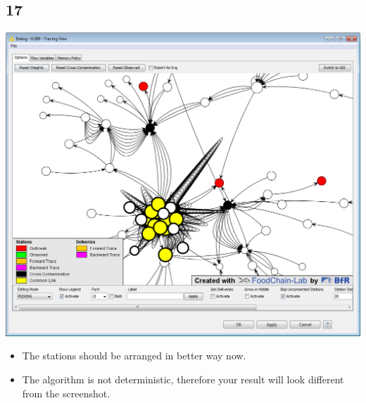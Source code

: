 \documentclass{beamer}
\begin{document}
\subsection{17}
\begin{frame}
	\begin{center}
  		\includegraphics[height=0.6\textheight]{17.png}
	\end{center}
	\begin{itemize}
		\item The stations should be arranged in better way now.
		\item The algorithm is not deterministic, therefore your result will look different from the screenshot.		
	\end{itemize}
\end{frame}
\end{document}
